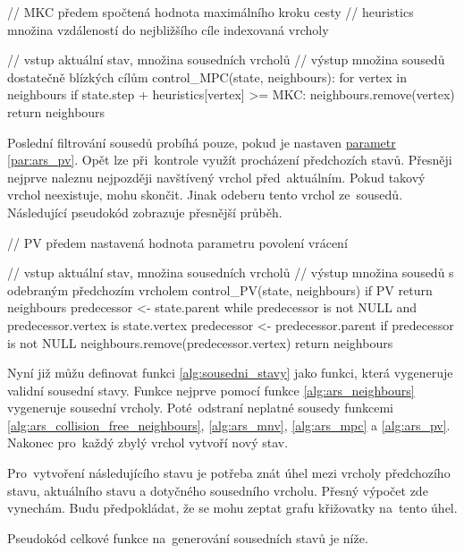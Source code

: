 \begin{code}[fontsize=\footnotesize]
// MKC předem spočtená hodnota maximálního kroku cesty
// heuristics množina vzdáleností do nejbližšího cíle indexovaná vrcholy

// vstup aktuální stav, množina sousedních vrcholů
// výstup množina sousedů dostatečně blízkých cílům
control_MPC(state, neighbours):
  for vertex in neighbours
    if state.step + heuristics[vertex] >= MKC:
      neighbours.remove(vertex)
  return neighbours
\end{code}

Poslední filtrování sousedů probíhá pouze, pokud je nastaven
\hyperref[subsubsec:ars_parametry]{parametr} \ref{par:ars_pv}.
Opět lze při~kontrole využít procházení předchozích stavů.
Přesněji nejprve naleznu nejpozději navštívený vrchol před~aktuálním.
Pokud takový vrchol neexistuje, mohu skončit.
Jinak odeberu tento vrchol ze~sousedů.
Následující pseudokód zobrazuje přesnější průběh.

\begin{code}[fontsize=\footnotesize]
// PV předem nastavená hodnota parametru povolení vrácení

// vstup aktuální stav, množina sousedních vrcholů
// výstup množina sousedů s odebraným předchozím vrcholem
control_PV(state, neighbours)
  if PV
    return neighbours
  predecessor <- state.parent
  while predecessor is not NULL and predecessor.vertex is state.vertex
    predecessor <- predecessor.parent
  if predecessor is not NULL
    neighbours.remove(predecessor.vertex)
  return neighbours
\end{code}

Nyní již můžu definovat funkci \ref{alg:sousedni_stavy} jako funkci, která vygeneruje validní sousední stavy.
Funkce nejprve pomocí funkce \ref{alg:ars_neighbours} vygeneruje sousední vrcholy.
Poté~odstraní neplatné sousedy funkcemi \ref{alg:ars_collision_free_neighbours},
\ref{alg:ars_mnv}, \ref{alg:ars_mpc} a \ref{alg:ars_pv}.
Nakonec pro~každý zbylý vrchol vytvoří nový stav.

Pro~vytvoření následujícího stavu je potřeba znát
úhel mezi vrcholy předchozího stavu, aktuálního stavu a dotyčného sousedního vrcholu.
Přesný výpočet zde vynechám.
Budu předpokládat, že se mohu zeptat grafu křižovatky na~tento úhel.

Pseudokód celkové funkce na~generování sousedních stavů je níže.


